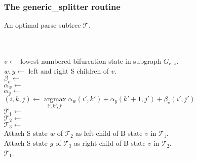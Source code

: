 \documentclass[11pt]{article}
\def\argmax{\mathop{\mathrm{argmax}}\limits}
\begin{document}
\subsubsection{The generic\_splitter routine}
\begin{algorithm}
         {An optimal parse subtree $\mathcal{T}$.}

\begin{algtab*}
  \algreturn {}\\
  \algreturn {}\\
\algelse
   $v   \leftarrow$ lowest numbered bifurcation state in subgraph $G_{r..z}$.\\
   $w,y \leftarrow$ left and right S children of $v$.\\
   $\beta_v \leftarrow$  \\
   $\alpha_w \leftarrow$ \\
   $\alpha_y \leftarrow$ \\

   $(i,k,j) \leftarrow \argmax_{i',k',j'} \alpha_w(i',k') + \alpha_y(k'+1,j') + \beta_v(i',j')$ \\

   $\mathcal{T}_1   \leftarrow$ \\
   $\mathcal{T}_2 \leftarrow$ \\
   $\mathcal{T}_3 \leftarrow$ \\

   Attach S state $w$ of $\mathcal{T}_2$ as left child of B state $v$ in $\mathcal{T}_1$.\\
   Attach S state $y$ of $\mathcal{T}_3$ as right child of B state $v$ in $\mathcal{T}_2$.\\
  
   \algreturn $\mathcal{T}_1$.\\
\algend
\end{algtab*}
\end{algorithm}
\end{document}
